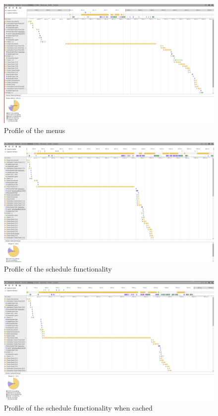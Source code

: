 \documentclass{eplmastersthesis}
\begin{document}
\begin{figure}[H]
\centering
\includegraphics[scale = 0.15]{Images/menus.png}
\caption{Profile of the menus}
\end{figure}
\begin{figure}[H]
\centering
\includegraphics[scale = 0.15]{Images/schedule.png}
\caption{Profile of the schedule functionality}
\end{figure}
\begin{figure}[H]
\centering
\includegraphics[scale = 0.15]{Images/schedulecached.png}
\caption{Profile of the schedule functionality when cached}
\end{figure}
\end{document}
